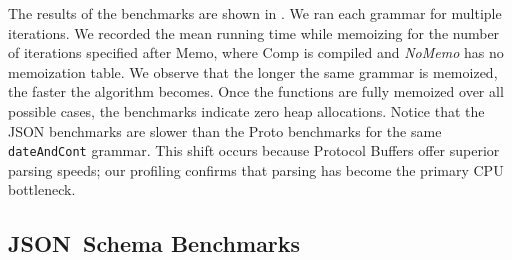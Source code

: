 \documentclass[runningheads]{llncs}
\newcommand{\JSONSchema}{%
  JSON~Schema\xspace%
}
\newcommand{\JSON}{\ac{JSON}\xspace}
\begin{document}
The results of the benchmarks are shown in .
We ran each grammar for multiple iterations.
We recorded the mean running time while memoizing for the number of iterations specified after Memo, where Comp is compiled and \emph{NoMemo} has no memoization table.
We observe that the longer the same grammar is memoized, the faster the algorithm becomes.
Once the functions are fully memoized over all possible cases, the benchmarks indicate zero heap allocations.
Notice that the \JSON benchmarks are slower than the Proto benchmarks for the same \lstinline{dateAndCont} grammar.
This shift occurs because Protocol Buffers offer superior parsing speeds; our profiling confirms that parsing has become the primary CPU bottleneck.

\subsection{\JSONSchema Benchmarks}
\end{document}
